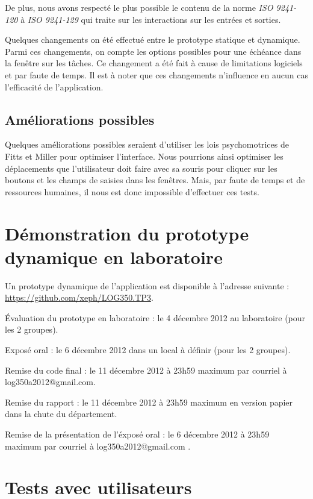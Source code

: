 \documentclass[letterpaper, oneside, 12pt, these, creativecommons]{thETS}
\begin{document}
De plus, nous avons respecté le plus possible le contenu de la norme \emph{ISO 9241-120} à \emph{ISO 9241-129} qui traite sur les interactions sur les entrées et sorties.

Quelques changements on été effectué entre le prototype statique et dynamique. Parmi ces changements, on compte les options possibles pour une échéance dans la fenêtre sur les tâches. Ce changement a été fait à cause de limitations logiciels et par faute de temps. Il est à noter que ces changements n'influence en aucun cas l'efficacité de l'application.

\section{Améliorations possibles}

Quelques améliorations possibles seraient d'utiliser les lois psychomotrices de Fitts et Miller pour optimiser l'interface. Nous pourrions ainsi optimiser les déplacements que l'utilisateur doit faire avec sa souris pour cliquer sur les boutons et les champs de saisies dans les fenêtres. Mais, par faute de temps et de ressources humaines, il nous est donc impossible d'effectuer ces tests.

\chapter{Démonstration du prototype dynamique en laboratoire}

Un prototype dynamique de l'application est disponible à l'adresse suivante : \\
\url{https://github.com/xeph/LOG350.TP3}.

Évaluation du prototype en laboratoire  : le 4 décembre 2012 au laboratoire (pour les 2 groupes).

Exposé oral  : le 6 décembre 2012 dans un local à définir (pour les 2 groupes).

Remise du code final : le 11 décembre 2012 à 23h59 maximum par courriel à log350a2012@gmail.com.

Remise du rapport :  le 11 décembre 2012 à 23h59 maximum en version papier dans la chute du département.

Remise de la présentation de l’éxposé oral : le 6 décembre 2012 à 23h59 maximum par courriel à log350a2012@gmail.com .

\chapter{Tests avec utilisateurs}
\end{document}
